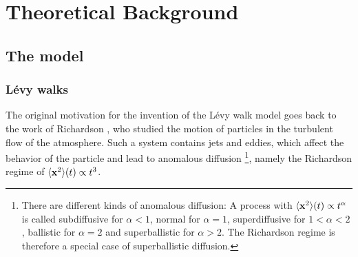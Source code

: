 \chapter{Theoretical Background}

\section{The model}

\subsection{L\'evy walks}

The original motivation for the invention of the L\'evy walk model goes back to the work of Richardson
\cite{richardson}, 
who studied the motion of particles in the turbulent flow of the atmosphere. Such a system contains jets and eddies, which affect the behavior of the particle and lead to anomalous diffusion
\footnote{There are different kinds of anomalous diffusion: A process with $\langle \mathbf{ x }^2 \rangle(t) \propto t^{\alpha}$ is called subdiffusive for $\alpha<1$, normal for $\alpha = 1$, superdiffusive for $1<\alpha<2$, ballistic for $\alpha=2$ and superballistic for $\alpha > 2 $. The Richardson regime is therefore a special case of superballistic diffusion.}, 
namely the Richardson regime of $\langle \mathbf{ x }^2 \rangle(t) \propto t^3 $.


